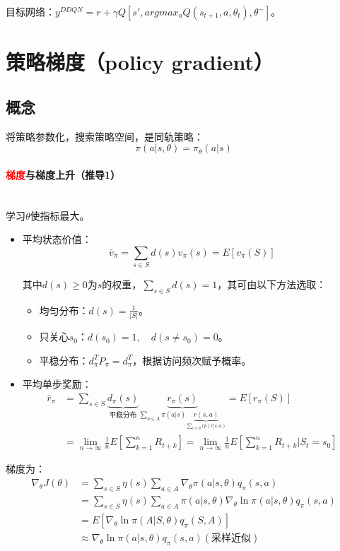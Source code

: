 \documentclass[
12pt, %
a4paper, 
oneside, %
]{scrartcl}
\begin{document}
目标网络：$ y^{DDQN} = r + \gamma Q[s', argmax_a Q(s_{t + 1}, a, \theta_t), \theta^-] $。
\section[策略梯度]{策略梯度（policy gradient）}
\subsection[概念]{概念}
将策略参数化，搜索策略空间，是同轨策略：
$$ \pi(a|s, \theta) = \pi_{\theta}(a|s) $$
\paragraph{\textcolor{red}{梯度}与梯度上升（推导1）}~\\

学习$ \theta $使指标最大。
\begin{itemize}
\item 平均状态价值：
$$ \bar{v}_\pi = \sum_{s \in S} d(s) v_\pi(s) = E[v_\pi(S)] $$

其中$ d(s) \geq 0 $为$ s $的权重，$ \sum_{s \in S} d(s) = 1 $，其可由以下方法选取：
\begin{itemize}
\item 均匀分布：$ d(s) = \frac{1}{|S|} $。
\item 只关心$ s_0 $：$ d(s_0) = 1, \quad d(s \neq s_0) = 0 $。
\item 平稳分布：$ d_{\pi}^T P_{\pi} = d_{\pi}^T $，根据访问频次赋予概率。
\end{itemize}
\item 平均单步奖励：
\begin{align*}
\bar{r}_\pi &= \sum_{s \in S} \underbrace{d_{\pi}(s)}_{\text{平稳分布}} \underbrace{r_\pi(s)}_{\sum_{a \in A} \pi(a|s)\underbrace{r(s, a)}_{\sum_{r \in R} r p(r|s, a)}} = E[r_\pi(S)] \\
&= \lim_{n \to \infty} \frac{1}{n}E[\sum_{k = 1}^{n} R_{t + k}] = \lim_{n \to \infty} \frac{1}{n}E[\sum_{k = 1}^{n} R_{t + k}|S_t = s_0]
\end{align*}
\end{itemize}

梯度为：
\begin{align*}
\nabla_\theta J(\theta) &= \sum_{s \in S} \eta(s) \sum_{a \in A} \nabla_\theta \pi(a|s, \theta) q_\pi(s, a) \\
&= \sum_{s \in S} \eta(s) \sum_{a \in A} \pi(a|s, \theta) \nabla_\theta \ln \pi(a|s, \theta) q_\pi(s, a) \\
&= E[\nabla_\theta \ln \pi(A|S, \theta) q_\pi(S, A)] \\
&\approx \nabla_\theta \ln \pi(a|s, \theta) q_\pi(s, a) (\text{采样近似})
\end{align*}
\end{document}
